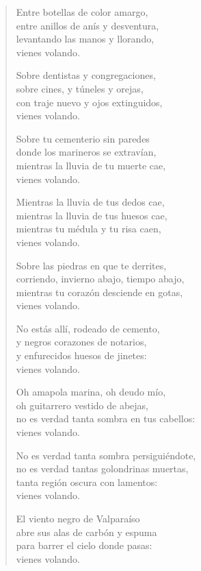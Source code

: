 \documentclass[12pt]{article}
\begin{document}
\begin{verse}
Entre botellas de color amargo,\\
entre anillos de anís y desventura,\\
levantando las manos y llorando,\\
vienes volando.  

Sobre dentistas y congregaciones,\\
sobre cines, y túneles y orejas,\\
con traje nuevo y ojos extinguidos,\\
vienes volando.  

Sobre tu cementerio sin paredes\\
donde los marineros se extravían,\\
mientras la lluvia de tu muerte cae,\\
vienes volando.  

Mientras la lluvia de tus dedos cae,\\
mientras la lluvia de tus huesos cae,\\
mientras tu médula y tu risa caen,\\
vienes volando.  

Sobre las piedras en que te derrites,\\
corriendo, invierno abajo, tiempo abajo,\\
mientras tu corazón desciende en gotas,\\
vienes volando.  

No estás allí, rodeado de cemento,\\
y negros corazones de notarios,\\
y enfurecidos huesos de jinetes:\\
vienes volando.  

Oh amapola marina, oh deudo mío,\\
oh guitarrero vestido de abejas,\\
no es verdad tanta sombra en tus cabellos:\\
vienes volando.  

No es verdad tanta sombra persiguiéndote,\\
no es verdad tantas golondrinas muertas,\\
tanta región oscura con lamentos:\\
vienes volando.  

El viento negro de Valparaíso\\
abre sus alas de carbón y espuma\\
para barrer el cielo donde pasas:\\
vienes volando.  


\end{verse}
\end{document}
